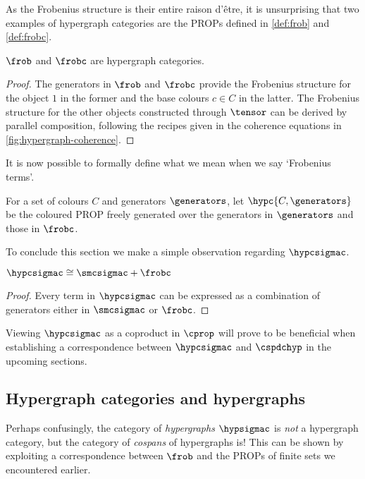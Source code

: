 As the Frobenius structure is their entire raison d'\^{e}tre, it is unsurprising
that two examples of hypergraph categories are the PROPs defined in
\cref{def:frob} and \cref{def:frobc}.

\begin{lemma}
    \(\frob\) and \(\frobc\) are hypergraph categories.
\end{lemma}
\begin{proof}
    The generators in \(\frob\) and \(\frobc\) provide the Frobenius
    structure for the object \(1\) in the former and the base colours
    \(c \in C\) in the latter.
    The Frobenius structure for the other objects constructed through
    \(\tensor\) can be derived by parallel composition, following the recipes
    given in the coherence equations in \cref{fig:hypergraph-coherence}.
\end{proof}

It is now possible to formally define what we mean when we say `Frobenius
terms'.

\begin{definition}
    For a set of colours \(C\) and generators \(\generators\), let
    \(\hypc{C,\generators}\) be the coloured PROP freely generated over the
    generators in \(\generators\) and those in \(\frobc\).
\end{definition}

To conclude this section we make a simple observation regarding \(\hypcsigmac\).

\begin{lemma}
    \(\hypcsigmac \cong \smcsigmac + \frobc\)
\end{lemma}
\begin{proof}
    Every term in \(\hypcsigmac\) can be expressed as a combination of
    generators either in \(\smcsigmac\) or \(\frobc\).
\end{proof}

Viewing \(\hypcsigmac\) as a coproduct in \(\cprop\) will prove to be beneficial
when establishing a correspondence between \(\hypcsigmac\) and \(\cspdchyp\) in
the upcoming sections.

\subsection{Hypergraph categories and hypergraphs}

Perhaps confusingly, the category of \emph{hypergraphs} \(\hypsigmac\) is
\emph{not} a hypergraph category, but the category of \emph{cospans} of
hypergraphs is!
This can be shown by exploiting a correspondence between \(\frob\) and the PROPs
of finite sets we encountered earlier.

